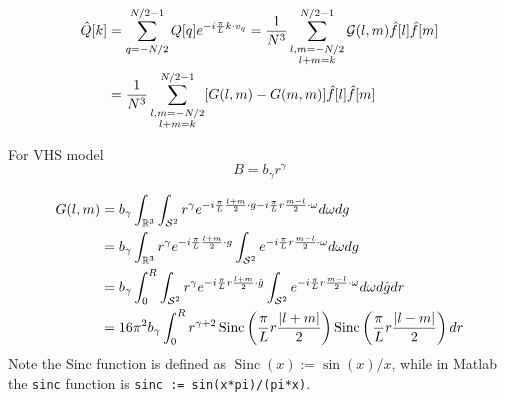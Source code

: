 \documentclass[11pt]{amsart}
\begin{document}
\color{blue}
\begin{align*}\begin{split}
\hat Q[k] &=  \sum_{q=-N/2}^{N/2-1} Q[q]e^{-i{\pi \over L}k\cdot v_q}=   \frac{1}{N^3} \sum_{\substack{l,m= -N/2 \\ l+m = k}}^{N/2-1}\mathcal{G}(l,m)\hat f[l] \hat f[m]  \\
&= \frac{1}{N^3} \sum_{\substack{l,m= -N/2 \\ l+m = k}}^{N/2-1} [G(l,m) - G(m,m)]\hat f[l] \hat f[m]
\end{split}\end{align*}
\color{black}

For VHS model
\begin{equation*}
B = b_\gamma r^{\gamma}
\end{equation*}

\begin{align*}
\begin{split}
G(l,m)  &= b_\gamma  \int_{\mathbb{R}^3} \int_{\mathcal{S}^2}  r^{\gamma}e^{-i{\pi \over L}\frac{l+m}{2} \cdot g -i {\pi \over L} r \frac{m-l}{2}\cdot \omega}d\omega dg \\
&= b_\gamma  \int_{\mathbb{R}^3}  r^{\gamma} e^{-i{\pi \over L}\frac{l+m}{2} \cdot g } \int_{\mathcal{S}^2} e^{-i {\pi \over L} r \frac{m-l}{2}\cdot \omega}d\omega dg \\
&= b_\gamma  \int_{0}^R\int_{\mathcal{S}^2}  r^{\gamma} e^{-i{\pi \over L}r\frac{l+m}{2} \cdot \hat g }\int_{\mathcal{S}^2}    e^{-i {\pi \over L} r \frac{m-l}{2}\cdot \omega}d\omega d\hat g dr \\
& = 16 \pi^{2} b_{\gamma} \int_{0}^{R} r^{\gamma+2} \operatorname{Sinc}\left(\frac{\pi}{L} r \frac{|l+m|}{2}\right) \operatorname{Sinc}\left(\frac{\pi}{L} r \frac{|l-m|}{2}\right) d r
\end{split}
\end{align*}
Note the Sinc function is defined as $\operatorname{Sinc}(x) := \sin(x)/x$, while in Matlab the \verb|sinc| function is   \verb|sinc := sin(x*pi)/(pi*x)|.
\end{document}
